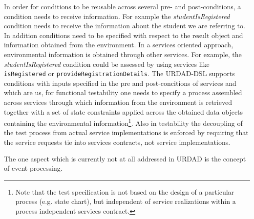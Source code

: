 In order for conditions to be reusable across several pre- and post-conditions, a condition needs to receive information. For example the \emph{studentIsRegistered} condition needs to receive the information about the student we are referring to. In addition conditions need to be specified with respect to the result object and information obtained from the environment. In a services oriented approach, environmental information is obtained through other services. For example, the \emph{studentIsRegistered} condition could be assessed by using services like \verb+isRegistered+ or \verb+provideRegistrationDetails+. The URDAD-DSL supports conditions with inputs specified in the pre and post-concitions of services and which are us, for functional testability one needs to specify a process assembled across services through which information from the environment is retrieved together with a set of state constraints applied across the obtained data objects containing the environmental information\footnote{Note that the test specification is not based on the design of a particular process (e.g. state chart), but independent of service realizations within a process independent services contract.}. Also in testability the decoupling of the test process from actual service implementations is enforced by requiring that the service requests tie into services contracts, not service implementations. 

The one aspect which is currently not at all addressed in URDAD is the concept of event processing.
 

